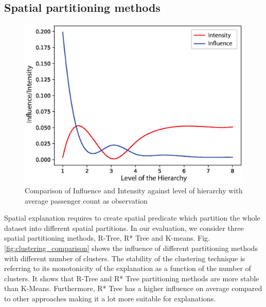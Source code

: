 \subsection{Spatial partitioning methods}
\label{sec:spatial_partitioning_methods}
\begin{figure}[t]
\includegraphics[width=\columnwidth]{images/hieint_passenger_count}
\caption{Comparison of Influence and Intensity against level of hierarchy with average passenger count as observation}
\label{fig:hieint_passenger_count}
\end{figure}
Spatial explanation requires to create spatial predicate which partition the whole dataset into different spatial partitions. In our evaluation, we consider three spatial partitioning methods, R-Tree, R* Tree and K-means. 
Fig. \ref{fig:clustering_comparison} shows the influence of different partitioning methods with different number of clusters. 
The stability of the clustering technique is referring to its monotonicity of the explanation as a function of the number of clusters. 
It shows that R-Tree and R* Tree partitioning methods are more stable than K-Means. 
Furthermore, R* Tree has a higher influence on average compared to other approaches making it a lot more suitable for explanations.

